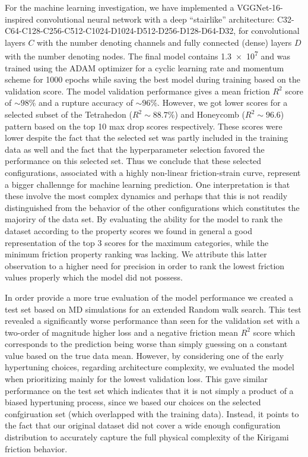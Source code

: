 For the machine learning investigation, we have implemented a VGGNet-16-inspired
convolutional neural network with a deep ``stairlike'' architecture:
C32-C64-C128-C256-C512-C1024-D1024-D512-D256-D128-D64-D32, for convolutional
layers $C$ with the number denoting channels and fully connected (dense) layers
$D$ with the number denoting nodes. The final model contains \num{1.3e7} and was
trained using the ADAM optimizer for a cyclic learning rate and momentum scheme
for 1000 epochs while saving the best model during training based on the
validation score. The model validation performance gives a mean friction $R^2$
score of $\sim 98\%$ and a rupture accuracy of $\sim 96 \%$. However, we got
lower scores for a selected subset of the Tetrahedon ($R^2 \sim 88.7 \%$) and
Honeycomb ($R^2 \sim 96.6$) pattern based on the top 10 max drop scores
respectively. These scores were lower despite the fact that the selected set was
partly included in the training data as well and the fact that the hyperparameter selection favored the performance on this selected set. Thus we conclude that these
selected configurations, associated with a highly non-linear friction-strain
curve, represent a bigger challennge for machine learning prediction. One interpretation is that these involve
the most complex dynamics and perhaps that this is not readily distinguished
from the behavior of the other configurations which constitutes the majoriry of the data set. By evaluating the ability for the model to rank the dataset according to the property scores we found in general a good representation of the top 3 scores for the maximum categories, while the minimum friction property ranking was lacking. We attribute this latter observation to a higher need for precision in order to rank the lowest friction values properly which the model did not possess.

In order provide a more true evaluation of the model performance we created a test set based on \acrshort{MD} simulations for an extended Random walk search. This test revealed a significantly worse performance than seen for the validation set with a two-order of magnitude higher loss and a negative friction mean $R^2$ score
which corresponds to the prediction being worse than simply guessing on a
constant value based on the true data mean. However, by considering one of the early hypertuning choices, regarding architecture complexity, we evaluated the model when prioritizing mainly for the lowest validation loss. This gave similar performance on the test set which indicates that it is not simply a product of a biased hypertuning process, since we based our choices on the selected confgiruation set (which overlapped with the training data). Instead, it points to the fact that our original dataset did not cover a wide enough configuration distribution to accurately capture the full physical complexity of the Kirigami friction behavior.  


